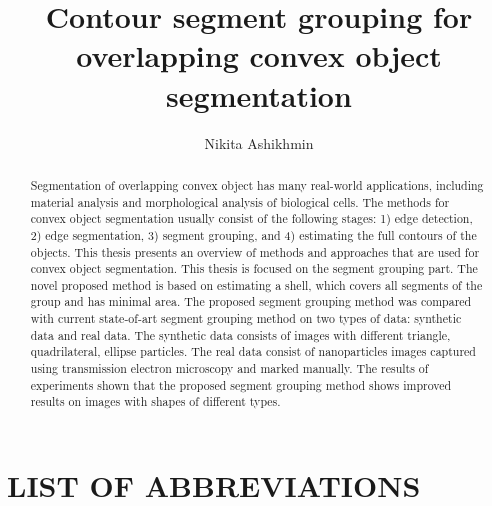 \documentclass{lutmscthesis}[2010/09/22]
\title{Contour segment grouping for overlapping convex object segmentation}
\author{Nikita Ashikhmin}
\begin{document}

\maketitle
\newpage

\begin{abstract}
Segmentation of overlapping convex object has many real-world applications, including material analysis and morphological analysis of biological cells. The methods for convex object segmentation usually consist of the following stages: 1) edge detection, 2) edge segmentation, 3) segment grouping, and 4) estimating the full contours of the objects. 
This thesis presents an overview of methods and approaches that are used for convex object segmentation. This thesis is focused on the segment grouping part. The novel proposed method is based on estimating a shell, which covers all segments of the group and has minimal area. The proposed segment grouping method was compared with current state-of-art segment grouping method on two types of data: synthetic data and real data. The synthetic data consists of images with different triangle, quadrilateral, ellipse particles. The real data consist of nanoparticles images captured using transmission electron microscopy and marked manually. The results of experiments shown that the proposed segment grouping method shows improved results on images with shapes of different types. 
\end{abstract}




\renewcommand\refname{REFERENCES}
\renewcommand\contentsname{CONTENTS}

\pagestyle{masters}
\newpage



\tableofcontents



\section*{LIST OF ABBREVIATIONS}
\end{document}
